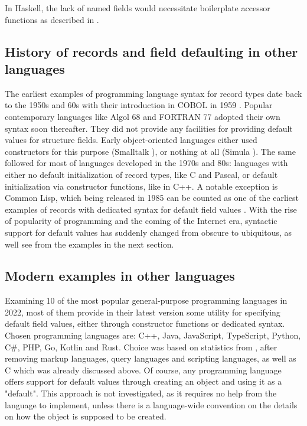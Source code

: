 \documentclass[en]{pracamgr}
\begin{document}
In Haskell, the lack of named fields would necessitate boilerplate accessor functions as described in \cite{WikibooksHaskellDatatypes}.

\subsection{History of records and field defaulting in other languages}
The earliest examples of programming language syntax for record types date back to the 1950s and 60s with their introduction in COBOL in 1959 \cite{sebesta1996concepts}.
Popular contemporary languages like Algol 68 \cite{van2012revised} and FORTRAN 77 \cite{fortran77} adopted their own syntax soon thereafter.
They did not provide any facilities for providing default values for structure fields.
Early object-oriented languages either used constructors for this purpose (Smalltalk \cite{smalltalk80}), or nothing at all (Simula \cite{Simula67}).
The same followed for most of languages developed in the 1970s and 80s: languages with either no default initialization of record types, like C and Pascal,
or default initialization via constructor functions, like in C++.
A notable exception is Common Lisp, which being released in 1985 can be counted 
as one of the earliest examples of records with dedicated syntax for default field values \cite{CommonLisp}.
With the rise of popularity of programming and the coming of the Internet era, 
syntactic support for default values has suddenly changed from obscure to ubiquitous, as well see from the examples in the next section.
\subsection{Modern examples in other languages}\label{subs:modernexamples}
Examining 10 of the most popular general-purpose programming languages in 2022,
most of them provide in their latest version some utility for specifying default field values,
either through constructor functions or dedicated syntax.
Chosen programming languages are: C++, Java, JavaScript, TypeScript, Python, C\#, PHP, Go, Kotlin and Rust.
Choice was based on statistics from \cite{StatistaProgLangs}, after removing markup languages, 
query languages and scripting languages, as well as C which was already discussed above.
Of course, any programming language offers support for default values through creating an object and using it as a "default".
This approach is not investigated, as it requires no help from the language to implement, unless there is a language-wide
convention on the details on how the object is supposed to be created. 
\end{document}
